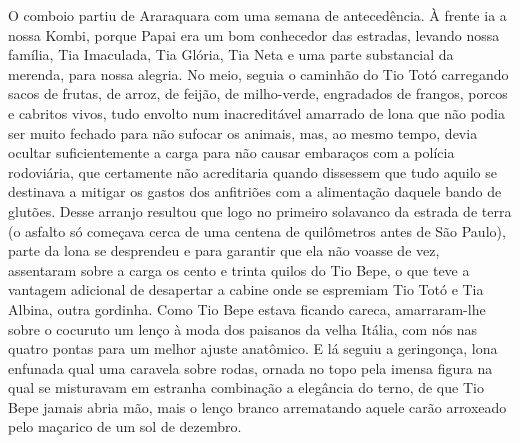 O comboio partiu de Araraquara com uma semana de antecedência.
À frente ia a nossa Kombi, porque Papai era um bom conhecedor das estradas, levando nossa família, Tia Imaculada, Tia Glória, Tia Neta e uma parte substancial da merenda, para nossa alegria.
No meio, seguia o caminhão do Tio Totó carregando sacos de frutas, de arroz, de feijão, de milho-verde, engradados de frangos, porcos e cabritos vivos, tudo envolto num inacreditável amarrado de lona que não podia ser muito fechado para não sufocar os animais, mas, ao mesmo tempo, devia ocultar suficientemente a carga para não causar embaraços com a polícia rodoviária, que certamente não acreditaria quando dissessem que tudo aquilo se destinava a mitigar os gastos dos anfitriões com a alimentação daquele bando de glutões.
Desse arranjo resultou que logo no primeiro solavanco da estrada de terra (o asfalto só começava cerca de uma centena de quilômetros antes de São Paulo), parte da lona se desprendeu e para garantir que ela não voasse de vez, assentaram sobre a carga os cento e trinta quilos do Tio Bepe, o que teve a vantagem adicional de desapertar a cabine onde se espremiam Tio Totó e Tia Albina, outra gordinha.
Como Tio Bepe estava ficando careca, amarraram-lhe sobre o cocuruto um lenço à moda dos paisanos da velha Itália, com nós nas quatro pontas para um melhor ajuste anatômico.
E lá seguiu a geringonça, lona enfunada qual uma caravela sobre rodas, ornada no topo pela imensa figura na qual se misturavam em estranha combinação a elegância do terno, de que Tio Bepe jamais abria mão, mais o lenço branco arrematando aquele carão arroxeado pelo maçarico de um sol de dezembro.

